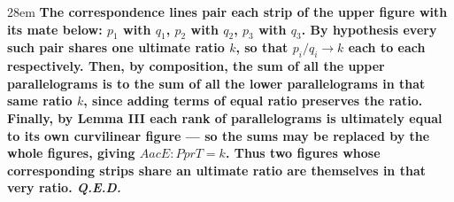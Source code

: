 \documentclass[border=4pt]{standalone}
\begin{document}
\begin{varwidth}{28em}
\large\bfseries
The correspondence lines pair each strip of the upper figure with its mate below: $p_1$ with $q_1$, $p_2$ with $q_2$, $p_3$ with $q_3$. By hypothesis every such pair shares one ultimate ratio $k$, so that $p_i / q_i \to k$ each to each respectively. Then, by composition, the sum of all the upper parallelograms is to the sum of all the lower parallelograms in that same ratio $k$, since adding terms of equal ratio preserves the ratio. Finally, by Lemma III each rank of parallelograms is ultimately equal to its own curvilinear figure --- so the sums may be replaced by the whole figures, giving $AacE : PprT = k$. Thus two figures whose corresponding strips share an ultimate ratio are themselves in that very ratio. \textit{Q.E.D.}
\end{varwidth}
\end{document}
